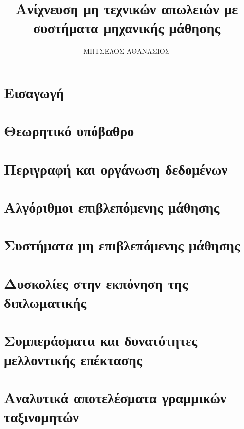 \documentclass[11pt,a4paper,english,greek,twoside]{dblab-thesis}
\title{Ανίχνευση μη τεχνικών απωλειών με συστήματα μηχανικής μάθησης}
\author{ΜΗΤΣΕΛΟΣ ΑΘΑΝΑΣΙΟΣ}
\begin{document}
\maketitle

\frontmatter
{}
\mainmatter

\tableofcontents
\listoffigures
\listoftables
\chapter{Εισαγωγή}


\chapter{Θεωρητικό υπόβαθρο}


\chapter{Περιγραφή και οργάνωση δεδομένων}


\chapter{Αλγόριθμοι επιβλεπόμενης μάθησης}


\chapter{Συστήματα μη επιβλεπόμενης μάθησης}


\chapter{Δυσκολίες στην εκπόνηση της διπλωματικής}


\chapter{Συμπεράσματα και δυνατότητες μελλοντικής επέκτασης}



%

\nocite{*}



\appendix
\chapter{Αναλυτικά αποτελέσματα γραμμικών ταξινομητών}

%
%
%

%

\backmatter
\printindex
\end{document}
